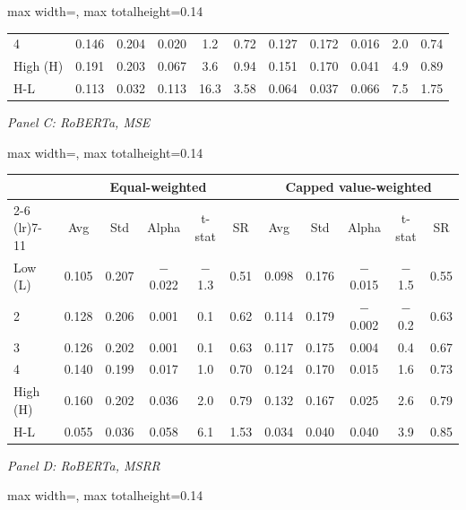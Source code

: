 \begin{table}[htbp]
{\begin{adjustbox}{max width=\linewidth, max totalheight=0.14\textheight}
\begin{tabular}{lcccccccccc}
4 & 0.146 & 0.204 & \phantom{$-$}0.020 & \phantom{$-$0}1.2 & 0.72 & 0.127 & 0.172 & \phantom{$-$}0.016 & \phantom{$-$}2.0 & 0.74 \\
High (H) & 0.191 & 0.203 & \phantom{$-$}0.067 & \phantom{$-$0}3.6 & 0.94 & 0.151 & 0.170 & \phantom{$-$}0.041 & \phantom{$-$}4.9 & 0.89 \\
H-L & 0.113 & 0.032 & \phantom{$-$}0.113 & \phantom{$-$}16.3 & 3.58 & 0.064 & 0.037 & \phantom{$-$}0.066 & \phantom{$-$}7.5 & 1.75 \\
\bottomrule
\end{tabular}
\end{adjustbox}
\par\medskip
\textit{Panel C: RoBERTa, MSE}\\[2pt]
\begin{adjustbox}{max width=\linewidth, max totalheight=0.14\textheight}
\begin{tabular}{lcccccccccc}
\toprule
 & \multicolumn{5}{c}{Equal-weighted} & \multicolumn{5}{c}{Capped value-weighted} \\
\cmidrule(lr){2-6} \cmidrule(lr){7-11}
 & Avg & Std & Alpha & t-stat & SR & Avg & Std & Alpha & t-stat & SR \\
\midrule
Low (L) & 0.105 & 0.207 & $-$0.022 & $-$1.3 & 0.51 & 0.098 & 0.176 & $-$0.015 & $-$1.5 & 0.55 \\
2 & 0.128 & 0.206 & \phantom{$-$}0.001 & \phantom{$-$}0.1 & 0.62 & 0.114 & 0.179 & $-$0.002 & $-$0.2 & 0.63 \\
3 & 0.126 & 0.202 & \phantom{$-$}0.001 & \phantom{$-$}0.1 & 0.63 & 0.117 & 0.175 & \phantom{$-$}0.004 & \phantom{$-$}0.4 & 0.67 \\
4 & 0.140 & 0.199 & \phantom{$-$}0.017 & \phantom{$-$}1.0 & 0.70 & 0.124 & 0.170 & \phantom{$-$}0.015 & \phantom{$-$}1.6 & 0.73 \\
High (H) & 0.160 & 0.202 & \phantom{$-$}0.036 & \phantom{$-$}2.0 & 0.79 & 0.132 & 0.167 & \phantom{$-$}0.025 & \phantom{$-$}2.6 & 0.79 \\
H-L & 0.055 & 0.036 & \phantom{$-$}0.058 & \phantom{$-$}6.1 & 1.53 & 0.034 & 0.040 & \phantom{$-$}0.040 & \phantom{$-$}3.9 & 0.85 \\
\bottomrule
\end{tabular}
\end{adjustbox}
\par\medskip
\textit{Panel D: RoBERTa, MSRR}\\[2pt]
\begin{adjustbox}{max width=\linewidth, max totalheight=0.14\textheight}

\end{adjustbox}}
\end{table}
